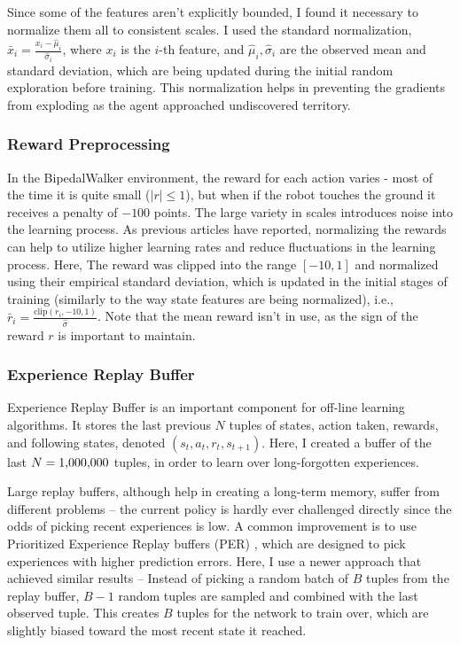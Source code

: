 \documentclass{article}
\begin{document}
\begin{multicols}{2}
Since some of the features aren't explicitly bounded, I found it necessary to normalize them all to consistent scales. I used the standard normalization, $\bar{x}_i = \frac{x_i - \hat{\mu}_i}{\hat{\sigma}_i}$, where $x_i$ is the $i$-th feature, and $\hat{\mu}_i, \hat{\sigma}_i$ are the observed mean and standard deviation, which are being updated during the initial random exploration before training. This normalization helps in preventing the gradients from exploding as the agent approached undiscovered territory.

\subsubsection{Reward Preprocessing}
In the BipedalWalker environment, the reward for each action varies - most of the time it is quite small ($|r| \leq 1$), but when if the robot touches the ground it receives a penalty of $-100$ points. The large variety in scales introduces noise into the learning process. As previous articles have reported, normalizing the rewards can help to utilize higher learning rates and reduce fluctuations in the learning process. Here, The reward was clipped into the range $[-10, 1]$ and normalized using their empirical standard deviation, which is updated in the initial stages of training (similarly to the way state features are being normalized), i.e., $\bar{r}_i = \frac{\text{clip}(r_i, -10, 1)}{\hat{\sigma}}$. Note that the mean reward isn't in use, as the sign of the reward $r$ is important to maintain.

\subsubsection{Experience Replay Buffer}
Experience Replay Buffer is an important component for off-line learning algorithms. It stores the last previous $N$ tuples of states, action taken, rewards, and following states, denoted $(s_t, a_t, r_t, s_{t+1})$. Here, I created a buffer of the last $N=1{\small ,}000{\small ,}000$ tuples, in order to learn over long-forgotten experiences. 

Large replay buffers, although help in creating a long-term memory, suffer from different problems -- the current policy is hardly ever challenged directly since the odds of picking recent experiences is low. A common improvement is to use Prioritized Experience Replay buffers (PER) \cite{PER}, which are designed to pick experiences with higher prediction errors. Here, I use a newer approach that achieved similar results \cite{ExpReplay} -- Instead of picking a random batch of $B$ tuples from the replay buffer, $B-1$ random tuples are sampled and combined with the last observed tuple. This creates $B$ tuples for the network to train over, which are slightly biased toward the most recent state it reached.


\end{multicols}
\end{document}
